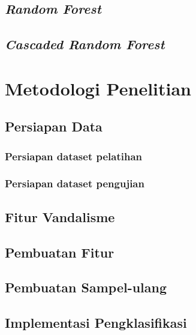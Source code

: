\section{\textit{Random Forest}}


\section{\textit{Cascaded Random Forest}}


\chapter{Metodologi Penelitian}


\section{Persiapan Data}
\label{persiapan_data}


\subsection{Persiapan dataset pelatihan}


\subsection{Persiapan dataset pengujian}


\section{Fitur Vandalisme}


\section{Pembuatan Fitur}


\newpage
\section{Pembuatan Sampel-ulang}


\section{Implementasi Pengklasifikasi}


